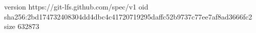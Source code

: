version https://git-lfs.github.com/spec/v1
oid sha256:2bd174732408304dd4dbc4c41720719295daffc52b9737c77ee7af8ad3666fc2
size 632873

